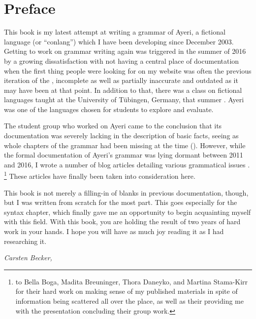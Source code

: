 \chapter{Preface}

This book is my latest attempt at writing a grammar of Ayeri, a fictional
language (or \enquote{conlang}) which I have been developing since December
2003. Getting to work on grammar writing again was triggered in the summer of
2016 by a growing dissatisfaction with not having a central place of
documentation when the first thing people were looking for on my website was
often the previous iteration of the , incomplete as well as
partially inaccurate and outdated as it may have been at that point. In
addition to that, there was a class on fictional languages taught at the
University of Tübingen, Germany, that summer \autocite{buch2016ss}. Ayeri was
one of the languages chosen for students to explore and evaluate.

The student group who worked on Ayeri came to the conclusion that its
documentation was severely lacking in the description of basic facts, seeing as
whole chapters of the grammar had been missing at the time
(\cite[12]{boga2016}). However, while the formal documentation of Ayeri's
grammar was lying dormant between 2011 and 2016, I wrote a number of blog
articles detailing various grammatical issues \autocite[Blog]{benung}.%
\footnote{ to Bella Boga, Madita
Breuninger, Thora Daneyko, and Martina Stama-Kirr for their hard work on making
sense of my published materials in spite of information being scattered all
over the place, as well as their providing me with the presentation concluding
their group work.} These articles have finally been taken into consideration
here.

This book is not merely a filling-in of blanks in previous documentation,
though, but I was written from scratch for the most part. This goes especially
for the syntax chapter, which finally gave me an opportunity to begin
acquainting myself with this field. With this book, you are holding the result
of two years of hard work in your hands. I hope you will have as much joy
reading it as I had researching it.

\begin{flushright}\itshape\footnotesize
{}
Carsten Becker,  \the\year
\end{flushright}

